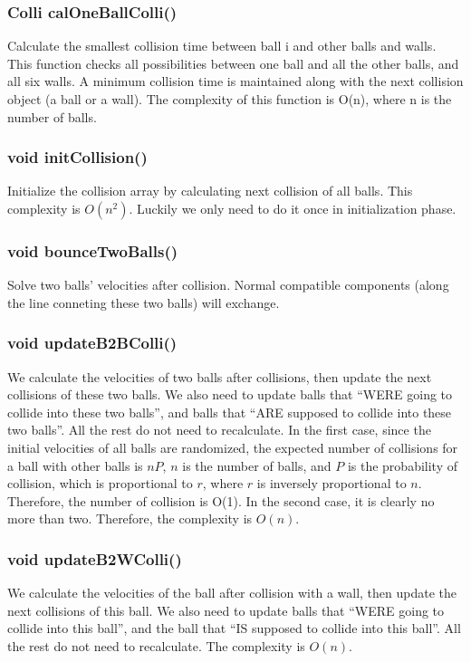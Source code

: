\documentclass[twoside,10pt]{article}
\begin{document}
\subsubsection{Colli calOneBallColli()}
Calculate the smallest collision time between ball i and other balls and walls. This function checks all possibilities between one ball and all the other balls, and all six walls. A minimum collision time is maintained along with the next collision object (a ball or a wall). The complexity of this function is O(n), where n is the number of balls.

\subsubsection{void initCollision()}
Initialize the collision array by calculating next collision of all balls. This complexity is $O(n^2)$. Luckily we only need to do it once in initialization phase. 

\subsubsection{void bounceTwoBalls()}
Solve two balls' velocities after collision. Normal compatible components (along the line conneting these two balls) will exchange. 

\subsubsection{void updateB2BColli()}
We calculate the velocities of two balls after collisions, then update the next collisions of these two balls. We also need to update balls that ``WERE going to collide into these two balls'', and balls that ``ARE supposed to collide into these two balls''. All the rest do not need to recalculate. In the first case, since the initial velocities of all balls are randomized, the expected number of collisions for a ball with other balls is $nP$, $n$ is the number of balls, and $P$ is the probability of collision, which is proportional to $r$, where $r$ is inversely proportional to $n$. Therefore, the number of collision is O(1). In the second case, it is clearly no more than two. Therefore, the complexity is $O(n)$.

\subsubsection{void updateB2WColli()}
We calculate the velocities of the ball after collision with a wall, then update the next collisions of this ball. We also need to update balls that ``WERE going to collide into this ball'', and the ball that ``IS supposed to collide into this ball''. All the rest do not need to recalculate. The complexity is $O(n)$.
\end{document}
